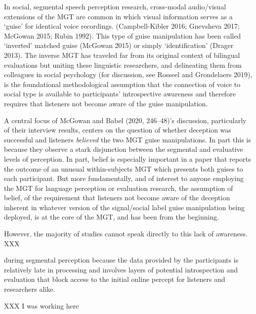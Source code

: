 \documentclass[
  letterpaper,
  DIV=11,
  numbers=noendperiod]{scrartcl}
\begin{document}
In social, segmental speech perception research, cross-modal
audio/visual extensions of the MGT are common in which visual
information serves as a `guise' for identical voice recordings.
(Campbell-Kibler 2016; Gnevsheva 2017; McGowan 2015; Rubin 1992). This
type of guise manipulation has been called `inverted' matched guise
(McGowan 2015) or simply `identification' (Drager 2013). The inverse MGT
has traveled far from its original context of bilingual evaluations but
uniting these linguistic researchers, and delineating them from
colleagues in social psychology (for discussion, see Rosseel and
Grondelaers 2019), is the foundational methodological assumption that
the connection of voice to social type is available to participants'
introspective awareness and therefore requires that listeners not become
aware of the guise manipulation.

A central focus of McGowan and Babel (2020, 246--48)'s discussion,
particularly of their interview results, centers on the question of
whether deception was successful and listeners \emph{believed} the two
MGT guise manipulations. In part this is because they observe a stark
disjunction between the segmental and evaluative levels of perception.
In part, belief is especially important in a paper that reports the
outcome of an unusual within-subjects MGT which presents both guises to
each participant. But more fundamentally, and of interest to anyone
employing the MGT for language perception or evaluation research, the
assumption of belief, of the requirement that listeners not become aware
of the deception inherent in whatever version of the signal/social label
guise manipulation being deployed, is at the core of the MGT, and has
been from the beginning.

However, the majority of studies cannot speak directly to this lack of
awareness. XXX

during segmental perception because the data provided by the
participants is relatively late in processing and involves layers of
potential introspection and evaluation that block access to the initial
online percept for listeners and researchers alike.

XXX I was working here
\end{document}
